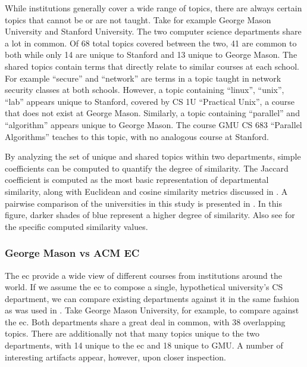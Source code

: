 
While institutions generally cover a wide range of topics, there are always certain topics that cannot be or are not taught.
Take for example George Mason University and Stanford University.
The two computer science departments share a lot in common.
Of 68 total topics covered between the two, 41 are common to both while only 14 are unique to Stanford and 13 unique to George Mason.
The shared topics contain terms that directly relate to similar courses at each school.
For example ``secure'' and ``network'' are terms in a topic taught in network security classes at both schools.
However, a topic containing ``linux'', ``unix'', ``lab'' appears unique to Stanford, covered by CS 1U ``Practical Unix'', a course that does not exist at George Mason.
Similarly, a topic containing ``parallel'' and ``algorithm'' appears unique to George Mason.
The course GMU CS 683 ``Parallel Algorithms'' teaches to this topic, with no analogous course at Stanford.


By analyzing the set of unique and shared topics within two departments, simple coefficients can be computed to quantify the degree of similarity.
The Jaccard coefficient is computed as the most basic representation of departmental similarity, along with Euclidean and cosine similarity metrics discussed in .
A pairwise comparison of the universities in this study is presented in .
In this figure, darker shades of blue represent a higher degree of similarity.
Also see  for the specific computed similarity values.


\subsubsection{George Mason vs ACM EC}
\label{sec:eval-comparison-acmec}


The \ac{ec} provide a wide view of different courses from institutions around the world.
If we assume the \ac{ec} to compose a single, hypothetical university's CS department, we can compare existing departments against it in the same fashion as was used in .
Take George Mason University, for example, to compare against the \ac{ec}.
Both departments share a great deal in common, with 38 overlapping topics.
There are additionally not that many topics unique to the two departments, with 14 unique to the \ac{ec} and 18 unique to GMU.
A number of interesting artifacts appear, however, upon closer inspection.

